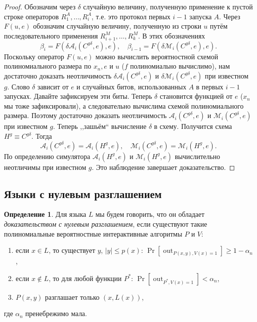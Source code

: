 \documentclass[12pt,a4paper]{article}
\DeclareMathOperator{\out}{out}
\theoremstyle{definition}
\newtheorem{definition}{Определение}[section]
\theoremstyle{plain}
\theoremstyle{remark}
\begin{document}
\begin{proof}
Обозначим через $\delta$ случайную величину, полученную применение к пустой 
строке операторов $R^A_1, \dotsc, R^A_i$, т.е. это протокол первых $i-1$ запуска $A$.
Через $F(u,e)$ обозначим случайную 
величину, полученную из строки $u$ путём последовательного применения 
$R^M_{i+1}, \dotsc, R^M_k$. В этих обозначениях
$$\beta_i     = F(\delta \mathcal A_i(C^{g\delta},e),e), \quad 
  \beta_{i-1} = F(\delta \mathcal M_i(C^{g\delta},e),e).$$
Поскольку оператор $F(u,e)$ можно вычислить вероятностной схемой 
полиномиального размера по $x_n, e$ и $u$ ($f$ полиномиально вычислимо), 
нам достаточно доказать неотличимость $\delta \mathcal A_i(C^{g\delta},e)$ и 
$\delta \mathcal M_i(C^{g\delta},e)$ при известном $g$. Слово $\delta$ зависит 
от $e$ и случайных битов, использованных $A$ в первых $i-1$ запусках. 
Давайте зафиксируем эти биты. Теперь $\delta$ становится
функцией от $e$ ($x_n$ мы тоже зафиксировали), а следовательно вычислима схемой полиномиального размера.
Поэтому достаточно доказать неотличимость $\mathcal A_i(C^{g\delta},e)$ и $\mathcal M_i(C^{g\delta},e)$ при известном $g$. Теперь ,,зашьём`` вычисление $\delta$ в схему. Получится схема $H^g \equiv C^{g\delta}$.
Тогда $$\mathcal A_i(C^{g\delta}, e) = \mathcal A_i(H^{g},e),\quad \mathcal M_i(C^{g\delta}, e) = \mathcal M_i(H^{g},e).$$
По определению симулятора $\mathcal A_i(H^{g},e)$ и $\mathcal M_i(H^{g},e)$ вычислительно неотличимы при известном $g$.
Это наблюдение завершает доказательство.
\end{proof}

\subsection{Языки с нулевым разглашением}

\begin{definition}
Для языка $L$ мы будем говорить, что он обладает \emph{доказательством с нулевым разглашением},
если существуют такие полиномиальные вероятностные интерактивные алгоритмы $P$ и $V$:
\begin{enumerate}
\item если $x\in L$, то существует $y$, $|y|\le p(x)$: $\Pr[\out_{P(x, y), V(x) = 1}]\ge 1-\alpha_n$,
\item если $x\not\in L$, то для любой функции $P^*$: $\Pr[\out_{P^*, V(x) = 1}] < \alpha_n$,
\item $P(x, y)$ разглашает только $(x, L(x))$,
\end{enumerate}
где $\alpha_n$ пренебрежимо мала.
\end{definition}
\end{document}
